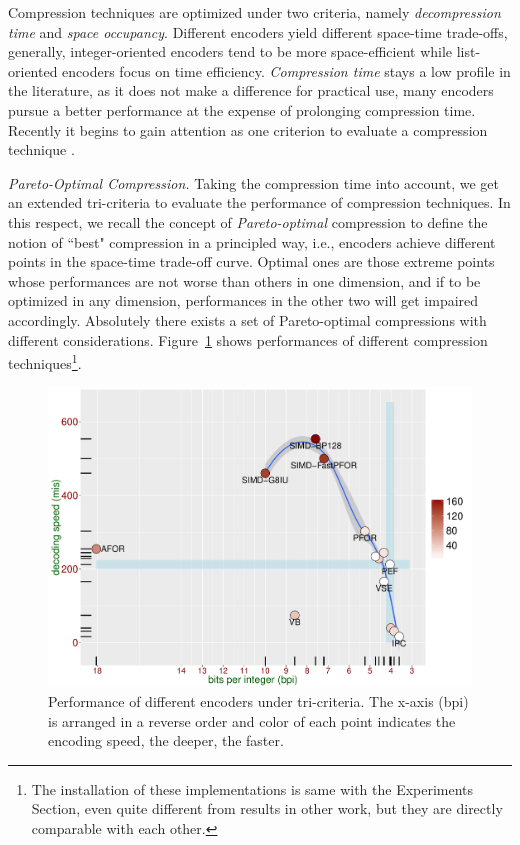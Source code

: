 \documentclass[runningheads]{comsis2}
\begin{document}
Compression techniques are optimized under two criteria, namely \textit{decompression time} and \textit{space occupancy}.
Different encoders yield different space-time trade-offs, generally, integer-oriented encoders tend to be more space-efficient while list-oriented encoders focus on time efficiency.
\textit{Compression time} stays a low profile in the literature, as it does not make a difference for practical use, many encoders pursue a better performance at the expense of prolonging compression time.
Recently it begins to gain attention as one criterion to evaluate a compression technique \cite{lemire2015decoding,ottaviano2015optimal}.

\textit{Pareto-Optimal Compression.}
Taking the compression time into account, we get an extended tri-criteria to evaluate the performance of compression techniques.
In this respect, we recall the concept of \textit{Pareto-optimal} compression to define the notion of ``best" compression in a principled way, i.e., encoders achieve different points in the space-time trade-off curve.
Optimal ones are those extreme points whose performances are not worse than others in one dimension, and if to be optimized in any dimension, performances in the other two will get impaired accordingly.
Absolutely there exists a set of Pareto-optimal compressions with different considerations.
Figure~\ref{fig:performance} shows performances of different compression techniques\footnote{The installation of these implementations is same with the Experiments Section, even quite different from results in other work, but they are directly comparable with each other.}.

\begin{figure}
	\centering
	\includegraphics[width=0.7\linewidth]{performance}
	\caption{Performance of different encoders under tri-criteria. The x-axis (bpi) is arranged in a reverse order and color of each point indicates the encoding speed, the deeper, the faster.}
	\label{fig:performance}
\end{figure}
\end{document}
